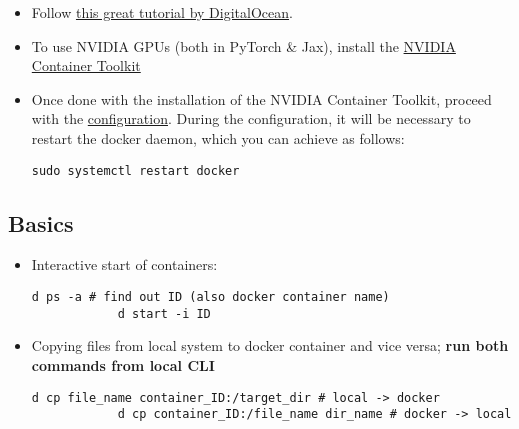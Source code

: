 \documentclass[12pt, a4paper]{article}
\numberwithin{equation}{section}
\theoremstyle{definition}
\theoremstyle{definition}
\begin{document}
	\begin{itemize}
		\item Follow  \href{https://www.digitalocean.com/community/tutorials/how-to-install-and-use-docker-on-ubuntu-20-04}{this great tutorial by DigitalOcean}.
		
		\item To use NVIDIA GPUs (both in PyTorch \& Jax), install the \href{https://docs.nvidia.com/datacenter/cloud-native/container-toolkit/latest/install-guide.html#installing-with-apt}{NVIDIA Container Toolkit}
		
		\item Once done with the installation of the NVIDIA Container Toolkit, proceed with the \href{https://docs.nvidia.com/datacenter/cloud-native/container-toolkit/latest/install-guide.html#configuring-docker}{configuration}. During the configuration, it will be necessary to restart the docker daemon, which you can achieve as follows: 
		
		\begin{lstlisting}[style=mystylebash, label=alg:docker_restart, xleftmargin=\parindent]
			sudo systemctl restart docker
		\end{lstlisting}
			
	\end{itemize}
	
	\subsection{Basics}
	
	\begin{itemize} 
		\item Interactive start of containers: 
		
		\begin{lstlisting}[style=mystylebash, label=alg:docker_id, xleftmargin=\parindent]
			d ps -a # find out ID (also docker container name)
			d start -i ID
		\end{lstlisting}
		
		\item Copying files from local system to docker container and vice versa; \textbf{run both commands from local CLI}
		
		\begin{lstlisting}[style=mystylebash, label=alg:docker_cp, xleftmargin=\parindent]
			d cp file_name container_ID:/target_dir # local -> docker
			d cp container_ID:/file_name dir_name # docker -> local
		\end{lstlisting}
	\end{itemize}
	
\end{document}
